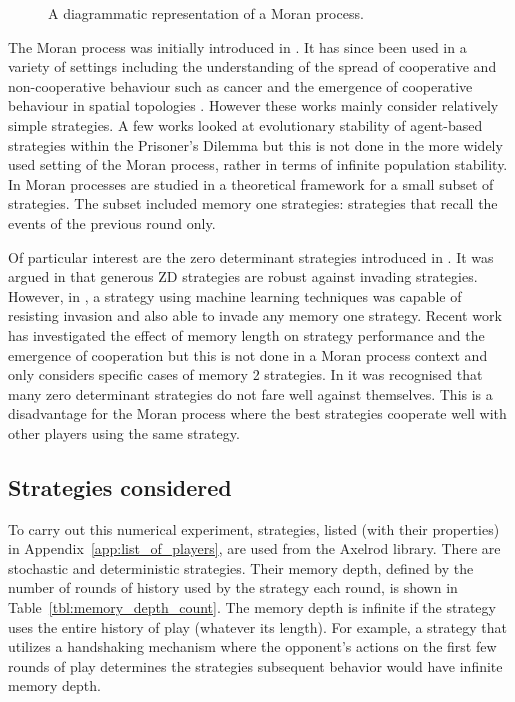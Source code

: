 \documentclass[10pt,journal]{IEEEtran}
\begin{document}
\begin{figure}[!hbtp]
    \centering
    \scalebox{.5}{ }
    \caption{A diagrammatic representation of a Moran process.}
    \label{fig:moran_process}
\end{figure}

The Moran process was initially introduced in \cite{Moran1957}. It has since
been used in a variety of settings including the understanding of the spread of
cooperative and non-cooperative behaviour such as cancer \cite{West2016} and the
emergence of cooperative behaviour in spatial topologies \cite{Nowak2017}.
However these works mainly consider relatively simple strategies. A few works 
looked at evolutionary stability of agent-based strategies within the Prisoner's Dilemma
\cite{Li2014} but this is not done in the more widely used setting of the Moran
process, rather in terms of infinite population stability. In \cite{Baek2016}
Moran processes are studied in a theoretical framework for a small subset of
strategies. The subset included memory one strategies: strategies that recall
the events of the previous round only.

Of particular interest are the zero determinant strategies introduced in
\cite{Press2012}. It was argued in \cite{stewart2013extortion} that generous
ZD strategies are robust against invading strategies. However, in \cite{Lee2015},
a strategy using machine learning techniques was capable of resisting invasion
and also able to invade any memory one strategy. Recent work \cite{Hilbe2017}
has investigated the effect of memory length on strategy performance and the
emergence of cooperation but this is not done in a Moran process context and only
considers specific cases of memory 2 strategies. In \cite{Adami2013} it was
recognised that many zero determinant strategies do not fare well against
themselves. This is a disadvantage for the Moran process where the best
strategies cooperate well with other players using the same strategy.

\subsection{Strategies considered}\label{sec:strategies}

To carry out this numerical experiment, 
strategies, listed (with their properties) in Appendix~\ref{app:list_of_players},
are used from the Axelrod library. There are
stochastic and
deterministic strategies. Their memory depth,
defined by the number of rounds of history used by the strategy each round, is
shown in Table~\ref{tbl:memory_depth_count}. The memory depth is infinite if the
strategy uses the entire history of play (whatever its length). For example, a
strategy that utilizes a handshaking mechanism where the opponent's actions on
the first few rounds of play determines the strategies subsequent behavior would
have infinite memory depth.
\end{document}
